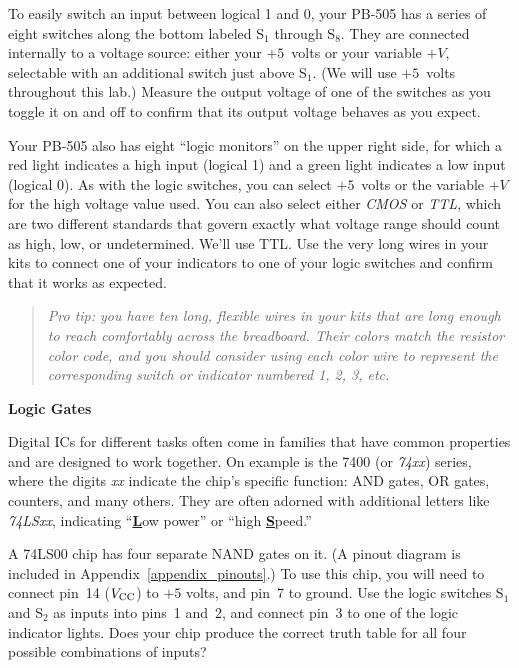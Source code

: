 \begin{enumerate}[wide]%
\item To easily switch an input between logical 1 and 0, your PB-505 has a series of eight switches along the bottom labeled S$_1$ through S$_8$.  They are connected internally to a voltage source: either your $+5$~volts or your variable $+V$, selectable with an additional switch just above S$_1$. (We will use $+5$~volts throughout this lab.) Measure the output voltage of one of the switches as you toggle it on and off to confirm that its output voltage behaves as you expect. 

\item Your PB-505 also has eight ``logic monitors'' on the upper right side, for which a red light indicates a high input (logical 1) and a green light indicates a low input (logical 0).  As with the logic switches, you can select  $+5$~volts or the variable $+V$ for the high voltage value used.  You can also select either \textit{CMOS} or \textit{TTL}, which are two different standards that govern exactly what voltage range should count as high, low, or undetermined.  We'll use TTL. Use the very long wires in your kits to connect one of your indicators to one of your logic switches and confirm that it works as expected.

\begin{quote}\textit{Pro tip: you have ten long, flexible wires in your kits that are long enough to reach comfortably across the breadboard.  Their colors match the resistor color code, and you should consider using each color wire to represent the corresponding switch or indicator numbered 1, 2, 3, etc.}
\end{quote}

\bigskip
\textbf{Logic Gates}

Digital ICs for different tasks often come in families that have common properties and are designed to work together. On example is the 7400 (or \textsl{74xx}) series, where the digits \textsl{xx} indicate the chip's specific function: AND gates, OR gates, counters, and many others.  They are often adorned with additional letters like \textsl{74LSxx}, indicating ``\underline{\textbf{L}}ow power'' or ``high \textbf{\underline{S}}peed.''

\begin{minipage}{0.77\textwidth}
\item A 74LS00 chip has four separate NAND gates on it.  (A pinout diagram is included in Appendix~\ref{appendix_pinouts}.) To use this chip, you will need to connect pin~14 ($V_{\rm CC}$) to $+5$ volts, and pin~7 to ground.  Use the logic switches S$_1$ and S$_2$ as inputs into pins~1 and~2, and connect pin~3 to one of the logic indicator lights.  Does your chip produce the correct truth table for all four possible combinations of inputs?\label{part_verify_nand_gate}


\end{minipage}
\end{enumerate}
